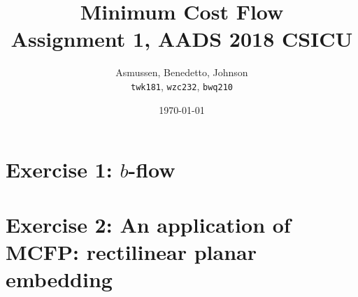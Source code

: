 \documentclass[a4paper,10pt,onecolumn,notitlepage]{report}
\date{\today}
\title{Minimum Cost Flow \\ Assignment 1, AADS 2018 CSICU}
\author{Asmussen, Benedetto, Johnson \\
\texttt{twk181}, \texttt{wzc232}, \texttt{bwq210}}
\begin{document}
\maketitle
\begingroup
\let\clearpage\relax
\tableofcontents
\endgroup
\twocolumn

\section{Exercise 1: $b$-flow}



\section{Exercise 2: An application of MCFP: rectilinear planar embedding}


\end{document}
